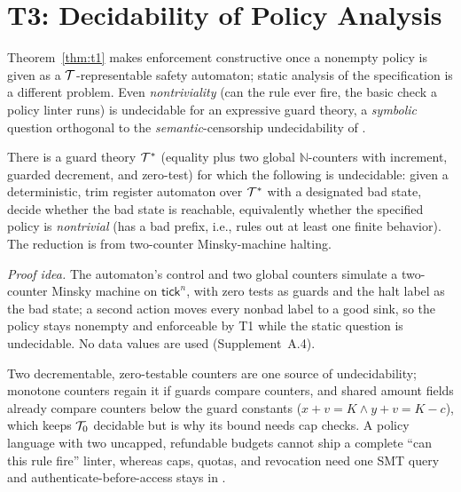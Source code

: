 \section{T3: Decidability of Policy Analysis}\label{sec:t3}

Theorem~\ref{thm:t1} makes enforcement constructive once a nonempty policy is given as a
$\mathcal{T}$-representable safety automaton; static analysis of the specification is a different
problem. Even \emph{nontriviality} (can the rule ever fire, the basic check a policy linter runs)
is undecidable for an expressive guard theory, a \emph{symbolic} question orthogonal to the
\emph{semantic}-censorship undecidability of \citet{glukhov2023censorship}.

\begin{proposition}\label{thm:undec}
There is a guard theory $\mathcal{T}^{\ast}$ (equality plus two global
$\mathbb N$-counters with increment, guarded decrement, and zero-test) for
which the following is undecidable: given
a deterministic, trim register automaton over $\mathcal{T}^{\ast}$ with a designated bad state,
decide whether the bad state is reachable, equivalently whether the specified
policy is \emph{nontrivial} (has a bad prefix, i.e., rules out at least one finite
behavior). The reduction is from two-counter Minsky-machine halting.
\end{proposition}

\noindent\emph{Proof idea.} The automaton's control and two global counters simulate a two-counter
Minsky machine \citep{minsky1967computation} on $\mathsf{tick}^n$, with zero tests as guards and
the halt label as the bad state; a second action moves every nonbad label to a good sink, so the
policy stays nonempty and enforceable by T1 while the static question is undecidable. No data
values are used (Supplement~A.4).

Two decrementable, zero-testable counters are one source of undecidability; monotone counters regain it if
guards compare counters, and shared amount fields already compare counters below the guard constants
($x+v=K\wedge y+v=K-c$), which keeps $\mathcal{T}_0$ decidable but is why its \NP{} bound needs cap checks. A policy
language with two uncapped, refundable budgets cannot ship a complete ``can this rule fire'' linter, whereas
caps, quotas, and revocation need one SMT query and authenticate-before-access stays in \PSPACE.

